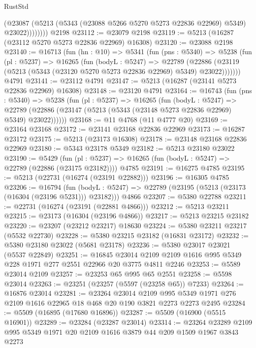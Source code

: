 \begin{lexlean}{RustStd}
\begin{coremodule}
                (@23087 (@5213 (@5343 (@23088 @5266 @5270 @5273 @22836 @22969) @5349) @23022))))))))
    @2198
@23112 := @23079 @2198
@23119 := @5213 (@16287 (@23112 @5270 @5273 @22836 @22969) @16308)
@23120 := @23088 @2198
@23140 := @16713
    (fun (hn : @10) =>
    @5341
      (fun (pns : @5340) =>
      @5238
        (fun (pl : @5237) =>
        @16265
          (fun (bodyL : @5247) =>
          @22789
            (@22886 (@23119 (@5213 (@5343 (@23120 @5270 @5273 @22836 @22969) @5349) @23022)))))))
    @4791
@23141 := @23112 @4791
@23147 := @5213 (@16287 (@23141 @5273 @22836 @22969) @16308)
@23148 := @23120 @4791
@23164 := @16743
    (fun (pns : @5340) =>
    @5238
      (fun (pl : @5237) =>
      @16265
        (fun (bodyL : @5247) =>
        @22789 (@22886 (@23147 (@5213 (@5343 (@23148 @5273 @22836 @22969) @5349) @23022))))))
@23168 := @11 @4768 (@11 @4777 @20)
@23169 := @23164 @23168
@23172 := @23141 @23168 @22836 @22969
@23173 := @16287 @23172
@23175 := @5213 (@23173 @16308)
@23178 := @23148 @23168 @22836 @22969
@23180 := @5343 @23178 @5349
@23182 := @5213 @23180 @23022
@23190 := @5429
    (fun (pl : @5237) => @16265 (fun (bodyL : @5247) => @22789 (@22886 (@23175 @23182))))
    @4785
@23191 := @16275 @4785
@23195 := @5213 (@22731 (@16274 (@23191 @22882)))
@23196 := @16305 @4785
@23206 := @16794
    (fun (bodyL : @5247) => @22789 (@23195 (@5213 (@23173 (@16304 (@23196 @5231))) @23182)))
    @4866
@23207 := @5380 @22788
@23211 := @22731 (@16274 (@23191 (@22881 @4866)))
@23212 := @5213 @23211
@23215 := @23173 (@16304 (@23196 @4866))
@23217 := @5213 @23215 @23182
@23220 := @23207 (@23212 @23217) @18630
@23224 := @5380 @23211 @23217 (@5532 @22730)
@23228 := @5380 @23215 @23182 (@16831 @23172)
@23232 := @5380 @23180 @23022 (@5681 @23178)
@23236 := @5380 @23017 @23021 (@5537 @22849)
@23251 := @16845
    @23014
    @2109
    @2109
    @1616
    @995
    @5349
    @228
    @1971
    @277
    @2551
    @22966
    @20
    @3775
    @4811
    @2246
@23253 := @5589 @23014 @2109
@23257 := @23253 @65 @995 @65 @2551
@23258 := @5598 @23014
@23263 := @23251 (@23257 (@5597 (@23258 @65)) @7233)
@23264 := @16876 @23014
@23281 := @23264
    @23014
    @2109
    @995
    @5349
    @1971
    @276
    @2109
    @1616
    @22965
    @18
    @468
    @20
    @190
    @3821
    @2273
    @2273
    @2495
@23284 := @5509 (@16895 (@17680 @16896))
@23287 := @5509 (@16900 (@5515 @16901))
@23289 := @23284 (@23287 @23014)
@23314 := @23264
    @23289
    @2109
    @995
    @5349
    @1971
    @20
    @2109
    @1616
    @3879
    @44
    @209
    @1509
    @1967
    @3843
    @2273

\end{coremodule}
\end{lexlean}
